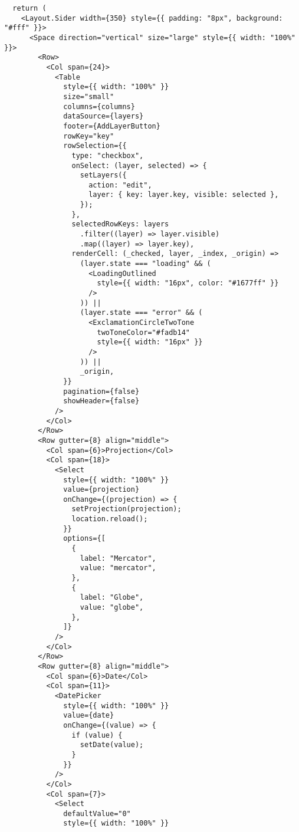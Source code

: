 \begin{verbatim}
  return (
    <Layout.Sider width={350} style={{ padding: "8px", background: "#fff" }}>
      <Space direction="vertical" size="large" style={{ width: "100%" }}>
        <Row>
          <Col span={24}>
            <Table
              style={{ width: "100%" }}
              size="small"
              columns={columns}
              dataSource={layers}
              footer={AddLayerButton}
              rowKey="key"
              rowSelection={{
                type: "checkbox",
                onSelect: (layer, selected) => {
                  setLayers({
                    action: "edit",
                    layer: { key: layer.key, visible: selected },
                  });
                },
                selectedRowKeys: layers
                  .filter((layer) => layer.visible)
                  .map((layer) => layer.key),
                renderCell: (_checked, layer, _index, _origin) =>
                  (layer.state === "loading" && (
                    <LoadingOutlined
                      style={{ width: "16px", color: "#1677ff" }}
                    />
                  )) ||
                  (layer.state === "error" && (
                    <ExclamationCircleTwoTone
                      twoToneColor="#fadb14"
                      style={{ width: "16px" }}
                    />
                  )) ||
                  _origin,
              }}
              pagination={false}
              showHeader={false}
            />
          </Col>
        </Row>
        <Row gutter={8} align="middle">
          <Col span={6}>Projection</Col>
          <Col span={18}>
            <Select
              style={{ width: "100%" }}
              value={projection}
              onChange={(projection) => {
                setProjection(projection);
                location.reload();
              }}
              options={[
                {
                  label: "Mercator",
                  value: "mercator",
                },
                {
                  label: "Globe",
                  value: "globe",
                },
              ]}
            />
          </Col>
        </Row>
        <Row gutter={8} align="middle">
          <Col span={6}>Date</Col>
          <Col span={11}>
            <DatePicker
              style={{ width: "100%" }}
              value={date}
              onChange={(value) => {
                if (value) {
                  setDate(value);
                }
              }}
            />
          </Col>
          <Col span={7}>
            <Select
              defaultValue="0"
              style={{ width: "100%" }}

\end{verbatim}
